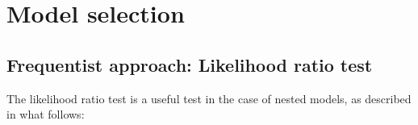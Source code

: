 \documentclass[a4paper,11pt]{article}
\newcommand{\Ex}{\mathbb{E}}
\theoremstyle{defi}
\numberwithin{thmCounter}{section}
\begin{document}





\section{Model selection}
\label{sec:model_selection}

\subsection{Frequentist approach: Likelihood ratio test}
The likelihood ratio test is a useful test in the case of nested models, as described in what follows:
\end{document}
